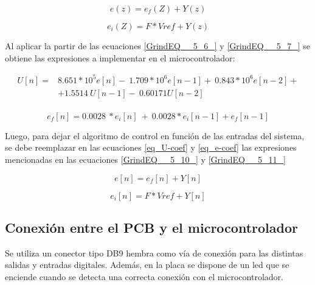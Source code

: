 \begin{equation} \label{GrindEQ__5_39_} 
	e(z)=e_f(Z)+Y(z) 
\end{equation} 

\begin{equation} \label{GrindEQ__5_40_} 
	e_i(Z)=F*Vref+Y(z) 
\end{equation} 


\noindent Al aplicar la partir de las ecuaciones \ref{GrindEQ__5_6_} y \ref{GrindEQ__5_7_} se obtiene las expresiones a implementar en el microcontrolador:

\begin{equation} 
	\begin{aligned}\label{eq_U-coef}
	U[n]=&8.651*10^5e[n]-\ 1.709*10^6e[n-1]+\ 0.843*10^6e[n-2]+\\
		 &+1.5514\ U[n-1]-\ 0.60171U[n-2]\\ 
	\end{aligned}
\end{equation}

\begin{equation} \label{eq_e-coef} 
	e_f[n]=0.0028{\ *e}_i[n]\ +\ {0.0028*e}_i[n-1]+e_f[n-1] 
\end{equation} 


\noindent Luego, para dejar el algoritmo de control en funci\'{o}n de las entradas del sistema, se debe reemplazar en las ecuaciones \ref{eq_U-coef} y \ref{eq_e-coef} las expresiones mencionadas en las ecuaciones \ref{GrindEQ__5_10_} y \ref{GrindEQ__5_11_}

\begin{equation} \label{GrindEQ__5_10_} 
	e[n]=e_f[n]+Y[n] 
\end{equation} 

\begin{equation} \label{GrindEQ__5_11_} 
	e_i[n]=F*Vref+Y[n] 
\end{equation} 

\subsection{Conexi\'{o}n entre el PCB y el microcontrolador}

\noindent Se utiliza un conector tipo DB9 hembra como v\'{i}a de conexi\'{o}n para las distintas salidas y entradas digitales. Adem\'{a}s, en la placa se dispone de un led que se enciende cuando  se detecta una correcta conexi\'{o}n con el microcontrolador.







